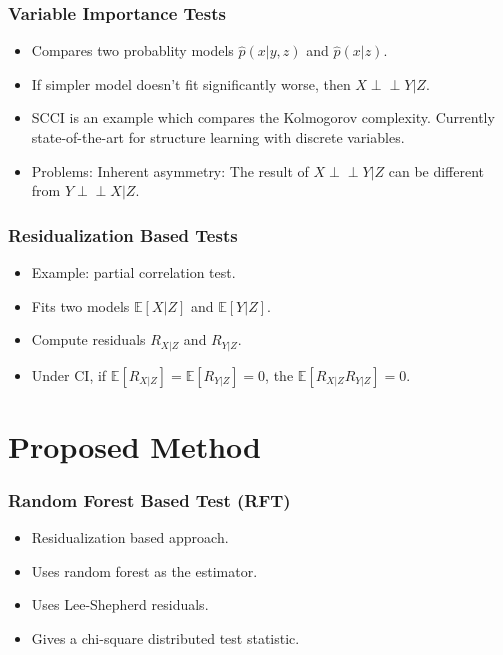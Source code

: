\documentclass{beamer}
\def\ci{\perp\!\!\!\!\!\perp}
\begin{document}
\begin{frame}
	\frametitle{Variable Importance Tests}
	\begin{itemize}
		\item Compares two probablity models $\hat{p}(x | y, z) $ and $
			\hat{p}(x | z) $.
		\item If simpler model doesn't fit significantly worse, then $
			X \ci Y | Z $.
		\item SCCI is an example which compares the Kolmogorov
			complexity. Currently state-of-the-art for structure
			learning with discrete variables.
		\item Problems: Inherent asymmetry: The result of $ X \ci Y | Z
			$ can be different from $ Y \ci X | Z $.
	\end{itemize}

\end{frame}

\begin{frame}
	\frametitle{Residualization Based Tests}
	\begin{itemize}
		\item Example: partial correlation test.
		\item Fits two models $ \mathbb{E}[X | Z] $ and $ \mathbb{E}[Y | Z] $.
		\item Compute residuals $ R_{X|Z} $ and $ R_{Y|Z} $.
		\item Under CI, if $ \mathbb{E}[R_{X|Z}] = \mathbb{E}[R_{Y|Z}] = 0 $, the
			$ \mathbb{E}[R_{X|Z}R_{Y|Z}] = 0 $. \footnotemark
	\end{itemize}
\end{frame}

\section{Proposed Method}
\begin{frame}
	\frametitle{Random Forest Based Test (RFT)}
	\begin{itemize}
		\item Residualization based approach.
		\item Uses random forest as the estimator.
		\item Uses Lee-Shepherd residuals.
		\item Gives a chi-square distributed test statistic.
	\end{itemize}
\end{frame}
\end{document}
